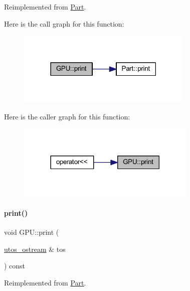 Reimplemented from \mbox{\hyperlink{class_part_a4fa402b8e8fd4236ff773a7697ab2bc3}{Part}}.

Here is the call graph for this function\+:
\nopagebreak
\begin{figure}[H]
\begin{center}
\leavevmode
\includegraphics[width=237pt]{class_g_p_u_abfa2a8fa30047e9759080d724e4b3820_cgraph}
\end{center}
\end{figure}
Here is the caller graph for this function\+:
\nopagebreak
\begin{figure}[H]
\begin{center}
\leavevmode
\includegraphics[width=242pt]{class_g_p_u_abfa2a8fa30047e9759080d724e4b3820_icgraph}
\end{center}
\end{figure}
\mbox{\label{class_g_p_u_acfa9ab35cdf1c25c324fc39c6ffc2412}} 
\paragraph{\texorpdfstring{print()}{print()}\hspace{0.1cm}{\footnotesize\ttfamily [2/4]}}
{\footnotesize\ttfamily void G\+P\+U\+::print (\begin{DoxyParamCaption}\item[{\mbox{\hyperlink{structutos__ostream}{utos\+\_\+ostream}} \&}]{tos }\end{DoxyParamCaption}) const\hspace{0.3cm}{\ttfamily [virtual]}}



Reimplemented from \mbox{\hyperlink{class_part_a9ecabe44ba3415badf82c6a23617a41e}{Part}}.

